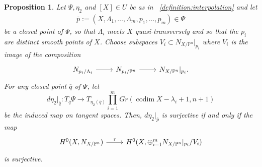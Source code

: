 \documentclass[reqno, 11pt]{amsart}
\theoremstyle{definition}
\theoremstyle{remark}
\numberwithin{equation}{section}
\numberwithin{thm}{section}
\numberwithin{prop}{section}
\numberwithin{lem}{section}
\numberwithin{cor}{section}
\numberwithin{conj}{section}
\numberwithin{defn}{section}
\theoremstyle{plain}
\newtheorem{proposition}[theorem]{Proposition}
\theoremstyle{definition}
\newcommand\bp{{\mathbb P}}
\newcommand \ra{\rightarrow}
\DeclareMathOperator\codim{codim}
\begin{document}
\begin{proposition}
	\label{proposition:tangent-space-to-psi}
	Let $\Psi, \eta_2$ and $[X] \in U$ be as in ~\autoref{definition:interpolation}
	and let 
	\begin{align*}
	  \overline p := (X, \Lambda_1, \ldots, \Lambda_m, p_1, \ldots, p_m) \in \Psi
	\end{align*}
	be a closed point of $\Psi$,
	so that $\Lambda_i$ meets $X$ quasi-transversely
	and so that the $p_i$ are distinct smooth points of $X$. Choose subspaces $V_i \subset N_{X/\bp^n}|_{p_i}$ where
$V_i$ is the image of the composition
\begin{equation}
	\nonumber
	\begin{tikzcd}
	  N_{p_i/\Lambda_i} \ar{r} & N_{p_i/\bp^n} \ar{r} & N_{X/\bp^n}|_{p_i}. 
	\end{tikzcd}\end{equation}
For any closed point $\overline q$  of $\Psi$, let \[d\eta_2|_{\overline{q}}: T_{\overline{q}} \Psi \ra T_{\eta_2(\overline q)}\prod_{i=1}^m Gr(\codim X - \lambda_i +1, n+1)\] be the
induced map on tangent spaces. Then, $d{\eta_2}|_{\overline p}$ is surjective 
if and only if the map
\begin{equation}
\nonumber
	\begin{tikzcd}
		H^0(X, N_{X/\bp^n}) \ar{r}{\tau} & H^0(X, \oplus_{i=1}^m N_{X/\bp^n}|_{p_i}/ V_i)
	\end{tikzcd}\end{equation}
is surjective.
\end{proposition}
\end{document}
